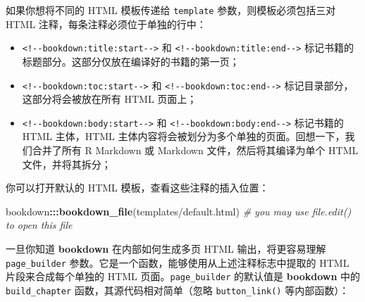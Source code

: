 \documentclass[
  12pt,
]{krantz}
\newenvironment{Shaded}{\begin{snugshade}}{\end{snugshade}}
\newcommand{\CommentTok}[1]{\textcolor[rgb]{0.56,0.35,0.01}{\textit{#1}}}
\newcommand{\FunctionTok}[1]{\textcolor[rgb]{0.13,0.29,0.53}{\textbf{#1}}}
\newcommand{\NormalTok}[1]{#1}
\newcommand{\SpecialCharTok}[1]{\textcolor[rgb]{0.81,0.36,0.00}{\textbf{#1}}}
\newcommand{\StringTok}[1]{\textcolor[rgb]{0.31,0.60,0.02}{#1}}
\providecommand{\tightlist}{%
  \setlength{\itemsep}{0pt}\setlength{\parskip}{0pt}}
\theoremstyle{definition}
\theoremstyle{definition}
\theoremstyle{definition}
\theoremstyle{definition}
\theoremstyle{remark}
\begin{document}
如果你想将不同的 HTML 模板传递给 \texttt{template} 参数，则模板必须包括三对 HTML 注释，每条注释必须位于单独的行中：

\begin{itemize}
\tightlist
\item
  \texttt{\textless{}!-\/-bookdown:title:start-\/-\textgreater{}} 和 \texttt{\textless{}!-\/-bookdown:title:end-\/-\textgreater{}} 标记书籍的标题部分。这部分仅放在编译好的书籍的第一页；
\item
  \texttt{\textless{}!-\/-bookdown:toc:start-\/-\textgreater{}} 和 \texttt{\textless{}!-\/-bookdown:toc:end-\/-\textgreater{}} 标记目录部分，这部分将会被放在所有 HTML 页面上；
\item
  \texttt{\textless{}!-\/-bookdown:body:start-\/-\textgreater{}} 和 \texttt{\textless{}!-\/-bookdown:body:end-\/-\textgreater{}} 标记书籍的 HTML 主体，HTML 主体内容将会被划分为多个单独的页面。回想一下，我们合并了所有 R Markdown 或 Markdown 文件，然后将其编译为单个 HTML 文件，并将其拆分；
\end{itemize}

你可以打开默认的 HTML 模板，查看这些注释的插入位置：

\begin{Shaded}
\begin{Highlighting}[]
\NormalTok{bookdown}\SpecialCharTok{:::}\FunctionTok{bookdown\_file}\NormalTok{(}\StringTok{\textquotesingle{}templates/default.html\textquotesingle{}}\NormalTok{)}
\CommentTok{\# you may use file.edit() to open this file}
\end{Highlighting}
\end{Shaded}

一旦你知道 \textbf{bookdown} 在内部如何生成多页 HTML 输出，将更容易理解 \texttt{page\_builder} 参数。它是一个函数，能够使用从上述注释标志中提取的 HTML 片段来合成每个单独的 HTML 页面。\texttt{page\_builder} 的默认值是 \textbf{bookdown} 中的 \texttt{build\_chapter} 函数，其源代码相对简单（忽略 \texttt{button\_link()} 等内部函数）：
\end{document}
